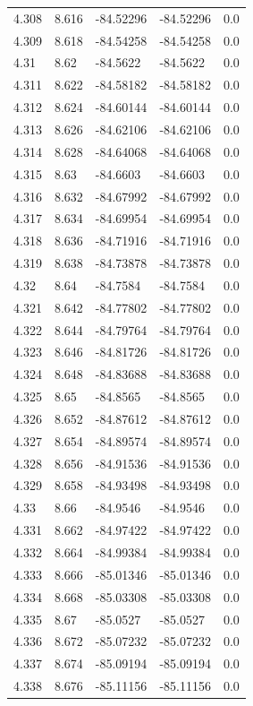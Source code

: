 \begin{tabular}{lllll}
4.308 & 8.616 & -84.52296 & -84.52296 & 0.0 \\
4.309 & 8.618 & -84.54258 & -84.54258 & 0.0 \\
4.31 & 8.62 & -84.5622 & -84.5622 & 0.0 \\
4.311 & 8.622 & -84.58182 & -84.58182 & 0.0 \\
4.312 & 8.624 & -84.60144 & -84.60144 & 0.0 \\
4.313 & 8.626 & -84.62106 & -84.62106 & 0.0 \\
4.314 & 8.628 & -84.64068 & -84.64068 & 0.0 \\
4.315 & 8.63 & -84.6603 & -84.6603 & 0.0 \\
4.316 & 8.632 & -84.67992 & -84.67992 & 0.0 \\
4.317 & 8.634 & -84.69954 & -84.69954 & 0.0 \\
4.318 & 8.636 & -84.71916 & -84.71916 & 0.0 \\
4.319 & 8.638 & -84.73878 & -84.73878 & 0.0 \\
4.32 & 8.64 & -84.7584 & -84.7584 & 0.0 \\
4.321 & 8.642 & -84.77802 & -84.77802 & 0.0 \\
4.322 & 8.644 & -84.79764 & -84.79764 & 0.0 \\
4.323 & 8.646 & -84.81726 & -84.81726 & 0.0 \\
4.324 & 8.648 & -84.83688 & -84.83688 & 0.0 \\
4.325 & 8.65 & -84.8565 & -84.8565 & 0.0 \\
4.326 & 8.652 & -84.87612 & -84.87612 & 0.0 \\
4.327 & 8.654 & -84.89574 & -84.89574 & 0.0 \\
4.328 & 8.656 & -84.91536 & -84.91536 & 0.0 \\
4.329 & 8.658 & -84.93498 & -84.93498 & 0.0 \\
4.33 & 8.66 & -84.9546 & -84.9546 & 0.0 \\
4.331 & 8.662 & -84.97422 & -84.97422 & 0.0 \\
4.332 & 8.664 & -84.99384 & -84.99384 & 0.0 \\
4.333 & 8.666 & -85.01346 & -85.01346 & 0.0 \\
4.334 & 8.668 & -85.03308 & -85.03308 & 0.0 \\
4.335 & 8.67 & -85.0527 & -85.0527 & 0.0 \\
4.336 & 8.672 & -85.07232 & -85.07232 & 0.0 \\
4.337 & 8.674 & -85.09194 & -85.09194 & 0.0 \\
4.338 & 8.676 & -85.11156 & -85.11156 & 0.0 \\

\end{tabular}
